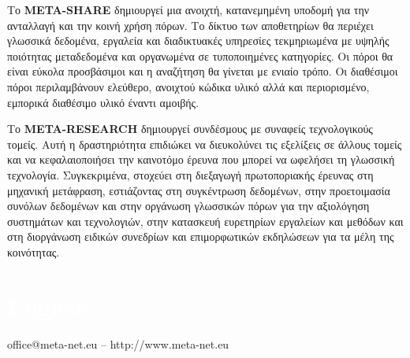\begin{multicols}{2}
Το \textbf{META-SHARE} δημιουργεί μια ανοιχτή, κατανεμημένη υποδομή για την ανταλλαγή και την κοινή χρήση πόρων. Το δίκτυο των αποθετηρίων θα περιέχει γλωσσικά δεδομένα, εργαλεία και διαδικτυακές υπηρεσίες τεκμηριωμένα με υψηλής ποιότητας μεταδεδομένα και οργανωμένα σε τυποποιημένες κατηγορίες. Οι πόροι θα είναι εύκολα προσβάσιμοι και η αναζήτηση θα γίνεται με ενιαίο τρόπο. Οι διαθέσιμοι πόροι περιλαμβάνουν ελεύθερο, ανοιχτού κώδικα υλικό αλλά και περιορισμένο, εμπορικά διαθέσιμο υλικό έναντι αμοιβής.

Το \textbf{META-RESEARCH} δημιουργεί συνδέσμους με συναφείς τεχνολογικούς τομείς. Αυτή η δραστηριότητα επιδιώκει να διευκολύνει τις εξελίξεις σε άλλους τομείς και να κεφαλαιοποιήσει την καινοτόμο έρευνα που μπορεί να ωφελήσει τη γλωσσική τεχνολογία. Συγκεκριμένα, στοχεύει στη διεξαγωγή πρωτοποριακής έρευνας στη μηχανική μετάφραση, εστιάζοντας στη συγκέντρωση δεδομένων, στην προετοιμασία συνόλων δεδομένων και στην οργάνωση γλωσσικών πόρων για την αξιολόγηση συστημάτων και τεχνολογιών, στην κατασκευή ευρετηρίων εργαλείων και μεθόδων και στη διοργάνωση ειδικών συνεδρίων και επιμορφωτικών εκδηλώσεων για τα μέλη της κοινότητας.
\end{multicols}

\vfill

\makeatletter
{}
{
  \renewcommand*{\theHsection}{\thepart.\thesection}
}
\makeatother
\part*{\textcolor{white}{English}}
\setcounter{section}{0}
\setcounter{figure}{0}

\centerline{office@meta-net.eu -- http://www.meta-net.eu}


\cleardoublepage



